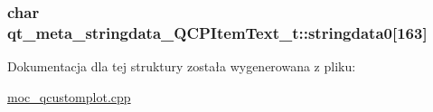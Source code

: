 \subsubsection[{\texorpdfstring{stringdata0}{stringdata0}}]{\setlength{\rightskip}{0pt plus 5cm}char qt\+\_\+meta\+\_\+stringdata\+\_\+\+Q\+C\+P\+Item\+Text\+\_\+t\+::stringdata0\mbox{[}163\mbox{]}}\hypertarget{structqt__meta__stringdata___q_c_p_item_text__t_ab2e92c59ac0dced63f1fc1f4cc75cbc7}{}\label{structqt__meta__stringdata___q_c_p_item_text__t_ab2e92c59ac0dced63f1fc1f4cc75cbc7}


Dokumentacja dla tej struktury została wygenerowana z pliku\+:\begin{DoxyCompactItemize}
\item 
\hyperlink{moc__qcustomplot_8cpp}{moc\+\_\+qcustomplot.\+cpp}\end{DoxyCompactItemize}
